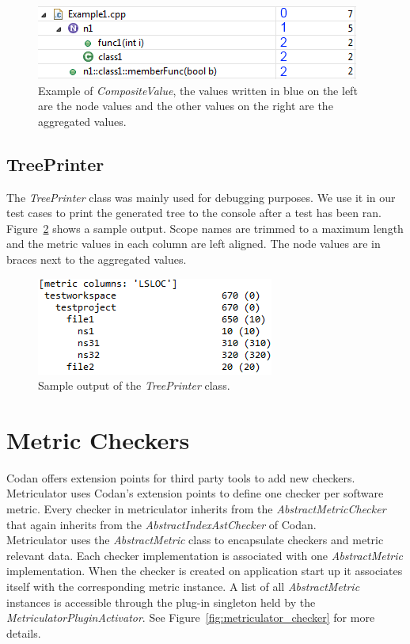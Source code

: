 \documentclass[11pt,a4paper,oneside]{scrreprt}
\begin{document}
\begin{figure}[th]
\begin{center}
\includegraphics[scale=0.8]{figures/compositeValue_example.png}
\end{center}
\caption{Example of \textit{CompositeValue}, the values written in blue on the left are the node values and the other values on the right are the aggregated values.}
\label{fig:compositeValue_example}
\end{figure}

\subsection{TreePrinter}
The \textit{TreePrinter} class was mainly used for debugging purposes. We use it in our test cases to print the generated tree to the console after a test has been ran. Figure~\ref{fig:TreePrinter} shows a sample output. Scope names are trimmed to a maximum length and the metric values in each column are left aligned. The node values are in braces next to the aggregated values.

\begin{figure}[th]
\begin{center}
\includegraphics[scale=0.8]{figures/treeprinter_output.png}
\end{center}
\caption{Sample output of the \textit{TreePrinter} class.}
\label{fig:TreePrinter}
\end{figure}

\section{Metric Checkers}\label{checkers}
Codan offers extension points for third party tools to add new checkers. Metriculator uses Codan's extension points to define one checker per software metric. Every checker in metriculator inherits from the \textit{AbstractMetricChecker} that again inherits from the \textit{AbstractIndexAstChecker} of Codan.\\
Metriculator uses the \textit{AbstractMetric} class to encapsulate checkers and metric relevant data. Each checker implementation is associated with one \textit{AbstractMetric} implementation. When the checker is created on application start up it associates itself with the corresponding metric instance. A list of all \textit{AbstractMetric} instances is accessible through the plug-in singleton held by the \textit{MetriculatorPluginActivator}. See Figure~\ref{fig:metriculator_checker} for more details.
\end{document}
